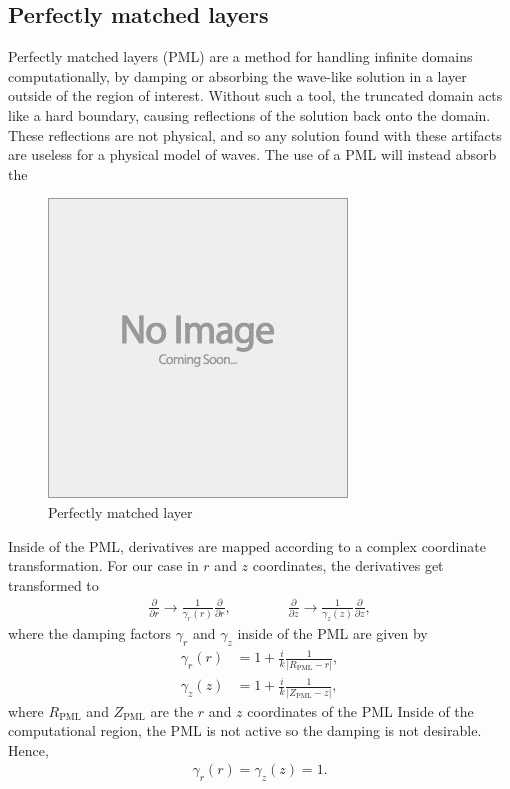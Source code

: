 \subsection{Perfectly matched layers}

Perfectly matched layers (PML) are a method for handling infinite domains computationally, by damping or absorbing the wave-like solution in a layer outside of the region of interest.
Without such a tool, the truncated domain acts like a hard boundary, causing reflections of the solution back onto the domain.
These reflections are not physical, and so any solution found with these artifacts are useless for a physical model of waves.
The use of a PML will instead absorb the 


\begin{figure}[h]
	\centering
	\includegraphics[draft]{images/placeholder}
	\caption{Perfectly matched layer \label{fig:pml}}
\end{figure}


Inside of the PML, derivatives are mapped according to a complex coordinate transformation.
For our case in $r$ and $z$ coordinates, the derivatives get transformed to
\begin{align}
	\frac{\partial}{\partial r} \rightarrow \frac{1}{\gamma_r(r)}\frac{\partial}{\partial r}, \qquad \qquad
	\frac{\partial}{\partial z} \rightarrow \frac{1}{\gamma_z(z)}\frac{\partial}{\partial z},
\end{align}
where the damping factors $\gamma_r$ and $\gamma_z$ inside of the PML are given by
\begin{align}
	\gamma_r(r) &= 1 + \frac{i}{k} \frac{1}{\left| R_{\text{PML}} - r \right|}, \\
	\gamma_z(z) &= 1 + \frac{i}{k} \frac{1}{\left| Z_{\text{PML}} - z \right|},
\end{align}
where $R_{\text{PML}}$ and $Z_{\text{PML}}$ are the $r$ and $z$ coordinates of the PML 
Inside of the computational region, the PML is not active so the damping is not desirable.
Hence,
\begin{align}
	\gamma_r(r) = \gamma_z(z) = 1.
\end{align}



